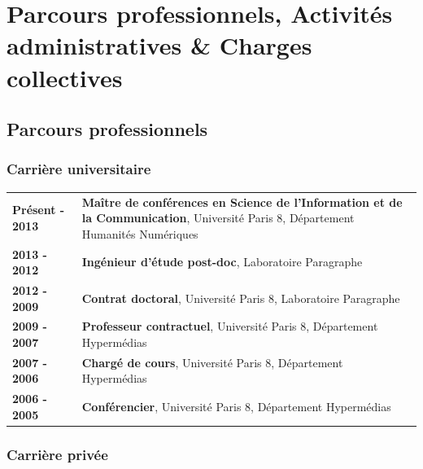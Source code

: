 \documentclass[
  a4paper,
  DIV=11,
  numbers=noendperiod]{scrreprt}
\begin{document}
\section{Parcours professionnels, Activités administratives \& Charges
collectives}\label{parcours-professionnels-activituxe9s-administratives-charges-collectives}

\subsection{Parcours professionnels}\label{parcours-professionnels}

\subsubsection*{Carrière universitaire}\label{carriuxe8re-universitaire}

\begin{longtable}[]{@{}
  >{\raggedright\arraybackslash}p{}
  >{\raggedright\arraybackslash}p{}@{}}
\toprule\noalign{}
\endhead
\bottomrule\noalign{}
\endlastfoot
\textbf{Présent - 2013} & \textbf{Maître de conférences en Science de
l'Information et de la Communication}, Université Paris 8, Département
Humanités Numériques \\
\textbf{2013 - 2012} & \textbf{Ingénieur d'étude post-doc}, Laboratoire
Paragraphe \\
\textbf{2012 - 2009} & \textbf{Contrat doctoral}, Université Paris 8,
Laboratoire Paragraphe \\
\textbf{2009 - 2007} & \textbf{Professeur contractuel}, Université Paris
8, Département Hypermédias \\
\textbf{2007 - 2006} & \textbf{Chargé de cours}, Université Paris 8,
Département Hypermédias \\
\textbf{2006 - 2005} & \textbf{Conférencier}, Université Paris 8,
Département Hypermédias \\
\end{longtable}

\subsubsection*{Carrière privée}\label{carriuxe8re-privuxe9e}
\end{document}
